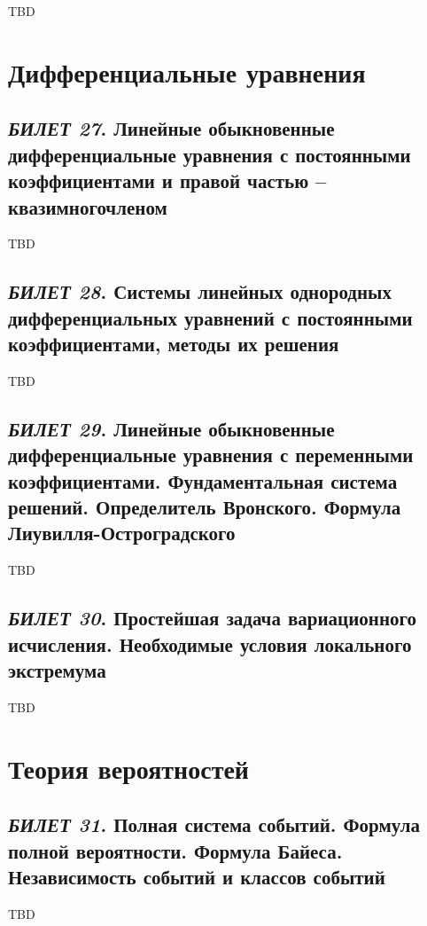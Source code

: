 \documentclass[12pt, a4paper, reqno]{article}
\begin{document}
    TBD

\newpage
\section{Дифференциальные уравнения}

\subsection{\textit{БИЛЕТ 27}. Линейные обыкновенные дифференциальные уравнения с постоянными
            коэффициентами и правой частью -- квазимногочленом}

    TBD

\newpage
\subsection{\textit{БИЛЕТ 28}. Системы линейных однородных дифференциальных уравнений с постоянными
            коэффициентами, методы их решения}

    TBD

\newpage
\subsection{\textit{БИЛЕТ 29}. Линейные обыкновенные дифференциальные уравнения с переменными
            коэффициентами. Фундаментальная система решений. Определитель Вронского. Формула
            Лиувилля-Остроградского}

    TBD

\newpage
\subsection{\textit{БИЛЕТ 30}. Простейшая задача вариационного исчисления. Необходимые условия
            локального экстремума}

    TBD

\newpage
\section{Теория вероятностей}

\subsection{\textit{БИЛЕТ 31}. Полная система событий. Формула полной вероятности. Формула Байеса.
            Независимость событий и классов событий}

    TBD
\end{document}
